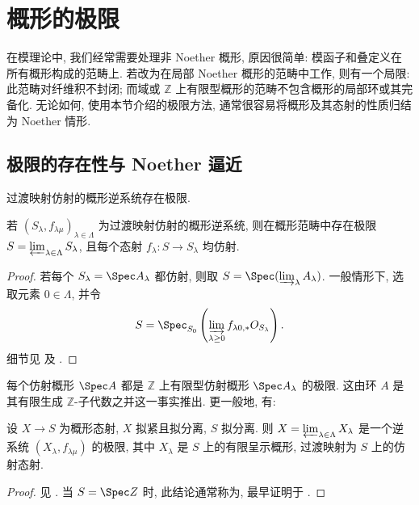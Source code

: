 \begingroup
\raggedbottom
\setlength{\emergencystretch}{2em}
\section{概形的极限}\label{src:B.3}
在模理论中, 我们经常需要处理非 Noether 概形, 原因很简单: 模函子和叠定义在所有概形构成的范畴上. 若改为在局部 Noether 概形的范畴中工作, 则有一个局限: 此范畴对纤维积不封闭; 而域或 $\mathbb Z$ 上有限型概形的范畴不包含概形的局部环或其完备化. 无论如何, 使用本节介绍的极限方法, 通常很容易将概形及其态射的性质归结为 Noether 情形.

\subsection{极限的存在性与 Noether 逼近}\label{src:B.3.1-subsection}
过渡映射仿射的概形逆系统存在极限.
\begin{proposition}[极限的存在性]\label{src:B.3.1}
若 $(S_\lambda,f_{\lambda\mu})_{\lambda\in\Lambda}$ 为过渡映射仿射的概形逆系统, 则在概形范畴中存在极限 $S=\varprojlim_{\lambda\in\Lambda}S_\lambda$, 且每个态射 $f_\lambda:S\to S_\lambda$ 均仿射.
\end{proposition}
\begin{proof}
若每个 $S_\lambda=\Spec A_\lambda$ 都仿射, 则取 $S=\Spec(\varinjlim_\lambda A_\lambda)$. 一般情形下, 选取元素 $0\in\Lambda$, 并令
\[
S=\Spec_{S_0}\left(\varinjlim_{\lambda\geq0}f_{\lambda0,*}\mathcal O_{S_\lambda}\right).
\]
细节见 \cite[IV.$8.2$]{EGA} 及 \cite[Tag 01YX]{SP}.
\end{proof}
每个仿射概形 $\Spec A$ 都是 $\mathbb Z$ 上有限型仿射概形 $\Spec A_\lambda$ 的极限. 这由环 $A$ 是其有限生成 $\mathbb Z$-子代数之并这一事实推出. 更一般地, 有:
\begin{proposition}[相对 Noether 逼近]\label{src:B.3.2}
设 $X\to S$ 为概形态射, $X$ 拟紧且拟分离, $S$ 拟分离. 则 $X=\varprojlim_{\lambda\in\Lambda}X_\lambda$ 是一个逆系统 $(X_\lambda,f_{\lambda\mu})$ 的极限, 其中 $X_\lambda$ 是 $S$ 上的有限呈示概形, 过渡映射为 $S$ 上的仿射态射.
\end{proposition}
\begin{proof}
见 \cite[Tag 09MV]{SP}. 当 $S=\Spec\mathbb Z$ 时, 此结论通常称为, 最早证明于 \cite[定理 C.$9$]{TT90}.
\end{proof}
